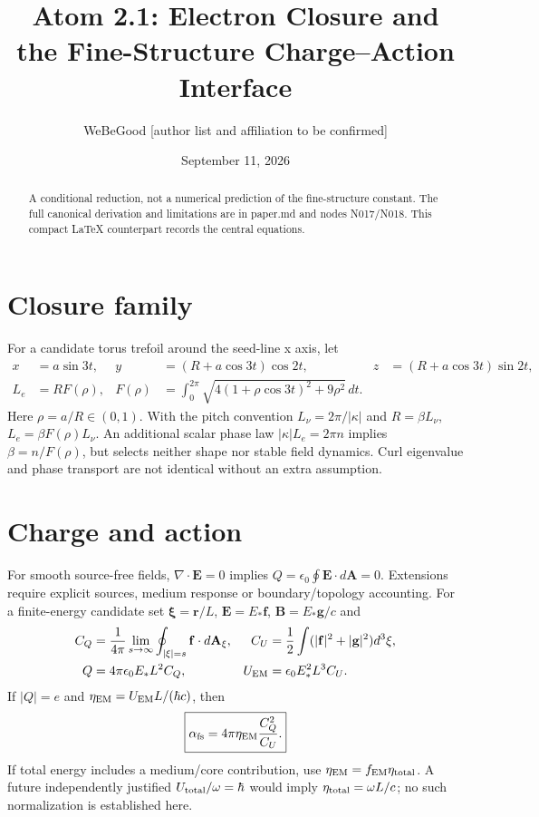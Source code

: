\documentclass[11pt]{article}
\title{Atom 2.1: Electron Closure and the Fine-Structure Charge--Action Interface}
\author{WeBeGood [author list and affiliation to be confirmed]}
\date{September 11, 2026}
\begin{document}
\maketitle
\begin{abstract}
A conditional reduction, not a numerical prediction of the fine-structure
constant. The full canonical derivation and limitations are in paper.md and
nodes N017/N018. This compact LaTeX counterpart records the central equations.
\end{abstract}
\section{Closure family}
For a candidate torus trefoil around the seed-line x axis, let
\begin{align}
x&=a\sin3t,&y&=(R+a\cos3t)\cos2t,&z&=(R+a\cos3t)\sin2t,\\
L_e&=R F(\rho),&F(\rho)&=\int_0^{2\pi}\sqrt{4(1+\rho\cos3t)^2+9\rho^2}\,dt.
\end{align}
Here $\rho=a/R\in(0,1)$. With the pitch convention $L_\nu=2\pi/|\kappa|$
and $R=\beta L_\nu$, $L_e=\beta F(\rho)L_\nu$. An additional scalar phase law
$|\kappa|L_e=2\pi n$ implies $\beta=n/F(\rho)$, but selects neither shape nor
stable field dynamics. Curl eigenvalue and phase transport are not identical
without an extra assumption.
\section{Charge and action}
For smooth source-free fields, $\nabla\cdot\mathbf E=0$ implies
$Q=\epsilon_0\oint\mathbf E\cdot d\mathbf A=0$. Extensions require explicit
sources, medium response or boundary/topology accounting.
For a finite-energy candidate set $\boldsymbol\xi=\mathbf r/L$,
$\mathbf E=E_*\mathbf f$, $\mathbf B=E_*\mathbf g/c$ and
\begin{align}
C_Q&=\frac{1}{4\pi}\lim_{s\to\infty}\oint_{|\xi|=s}\mathbf f\cdot d\mathbf A_\xi,&
C_U&=\frac12\int (|\mathbf f|^2+|\mathbf g|^2)d^3\xi,\\
Q&=4\pi\epsilon_0 E_*L^2 C_Q,&U_{\rm EM}&=\epsilon_0 E_*^2L^3 C_U.
\end{align}
If $|Q|=e$ and $\eta_{\rm EM}=U_{\rm EM}L/(\hbar c)$, then
\begin{equation}\boxed{\alpha_{\rm fs}=4\pi\eta_{\rm EM}\frac{C_Q^2}{C_U}.}\end{equation}
If total energy includes a medium/core contribution, use
$\eta_{\rm EM}=f_{\rm EM}\eta_{\rm total}$. A future independently justified
$U_{\rm total}/\omega=\hbar$ would imply $\eta_{\rm total}=\omega L/c$;
no such normalization is established here.
\end{document}
